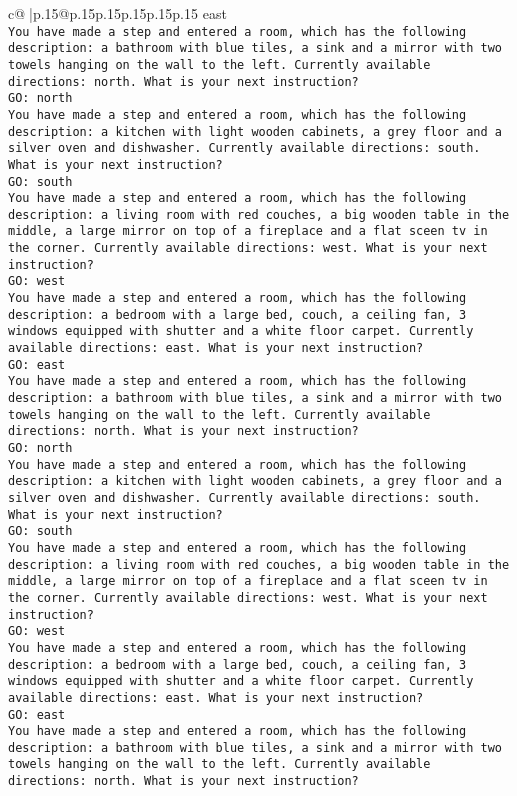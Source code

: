 \documentclass{article}
\begin{document}
{\begin{supertabular}{c@{$\;$}|p{.15\linewidth}@{}p{.15\linewidth}p{.15\linewidth}p{.15\linewidth}p{.15\linewidth}p{.15\linewidth}}
{{{east\\ \tt You have made a step and entered a room, which has the following description: a bathroom with blue tiles, a sink and a mirror with two towels hanging on the wall to the left. Currently available directions: north. What is your next instruction?\\ \tt GO: north\\ \tt You have made a step and entered a room, which has the following description: a kitchen with light wooden cabinets, a grey floor and a silver oven and dishwasher. Currently available directions: south. What is your next instruction?\\ \tt GO: south\\ \tt You have made a step and entered a room, which has the following description: a living room with red couches, a big wooden table in the middle, a large mirror on top of a fireplace and a flat sceen tv in the corner. Currently available directions: west. What is your next instruction?\\ \tt GO: west\\ \tt You have made a step and entered a room, which has the following description: a bedroom with a large bed, couch, a ceiling fan, 3 windows equipped with shutter and a white floor carpet. Currently available directions: east. What is your next instruction?\\ \tt GO: east\\ \tt You have made a step and entered a room, which has the following description: a bathroom with blue tiles, a sink and a mirror with two towels hanging on the wall to the left. Currently available directions: north. What is your next instruction?\\ \tt GO: north\\ \tt You have made a step and entered a room, which has the following description: a kitchen with light wooden cabinets, a grey floor and a silver oven and dishwasher. Currently available directions: south. What is your next instruction?\\ \tt GO: south\\ \tt You have made a step and entered a room, which has the following description: a living room with red couches, a big wooden table in the middle, a large mirror on top of a fireplace and a flat sceen tv in the corner. Currently available directions: west. What is your next instruction?\\ \tt GO: west\\ \tt You have made a step and entered a room, which has the following description: a bedroom with a large bed, couch, a ceiling fan, 3 windows equipped with shutter and a white floor carpet. Currently available directions: east. What is your next instruction?\\ \tt GO: east\\ \tt You have made a step and entered a room, which has the following description: a bathroom with blue tiles, a sink and a mirror with two towels hanging on the wall to the left. Currently available directions: north. What is your next instruction?\\ \tt }}}
\end{supertabular}}
\end{document}
